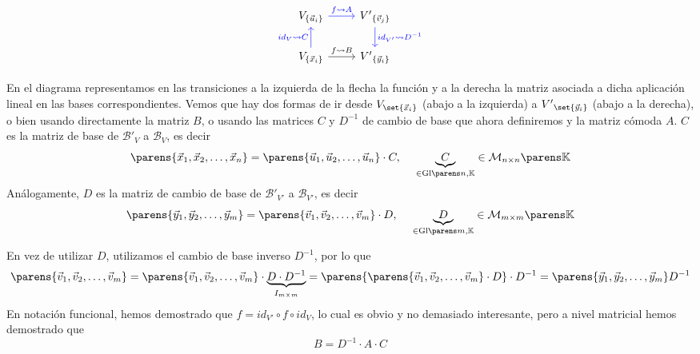 \documentclass[../algebra_lineal.tex]{subfiles}
\begin{document}

\begin{equation*}
\begin{tikzcd}
    V_{\{\vec{u}_i\}} \arrow[blue, r, "f \rightsquigarrow A"]                                       & {V'}_{\{\vec{v}_j\}} \arrow[blue, d, "id_{V'} \rightsquigarrow D^{-1}"] \\
    V_{\{\vec{x}_i\}} \arrow[r, "f \rightsquigarrow B"] \arrow[blue, u, "id_V \rightsquigarrow C "] & {V'}_{\{\vec{y}_i\}}                                             
\end{tikzcd}
\end{equation*}

%

En el diagrama representamos en las transiciones a la izquierda de la flecha la función y a la derecha la matriz asociada a dicha aplicación lineal en las bases correspondientes. Vemos que hay dos formas de ir desde $V_{\set{\vx_i}}$ (abajo a la izquierda) a ${V'}_{\set{\vy_i}}$ (abajo a la derecha), o bien usando directamente la matriz $B$, o usando las matrices $C$ y $D^{-1}$ de cambio de base que ahora definiremos y la matriz cómoda $A$. $C$ es la matriz de base de $\mathcal{B'}_V$ a $\mathcal{B}_V$, es decir
\[
\parens{\vlst{x}{n}} = \parens{\vlst{u}{n}} \cdot C, \spc \spc \spc \underbrace{C}_{\in \glk{n}} \in \mgk{n}{n}
\]
Análogamente, $D$ es la matriz de cambio de base de  $\mathcal{B'}_{V'}$ a $\mathcal{B}_{V'}$, es decir
\[
\parens{\vlst{y}{m}} = \parens{\vlst{v}{m}} \cdot D, \spc \spc \spc \underbrace{D}_{\in \glk{m}} \in \mgk{m}{m}
\]

En vez de utilizar $D$, utilizamos el cambio de base inverso $D^{-1}$, por lo que
\[
    \parens{\vlst{v}{m}} = \parens{\vlst{v}{m}} \cdot \underbrace{ D \cdot D^{-1} }_{I_{m \times m}} = \parens{\parens{\vlst{v}{m}} \cdot D} \cdot D^{-1} = \parens{\vlst{y}{m}} D^{-1}
\]
En notación funcional, hemos demostrado que $f = id_{V'} \circ f \circ id_{V}$, lo cual es obvio y no demasiado interesante, pero a nivel matricial hemos demostrado que 
\[
    B = D^{-1} \cdot A \cdot C
\]
\end{document}
